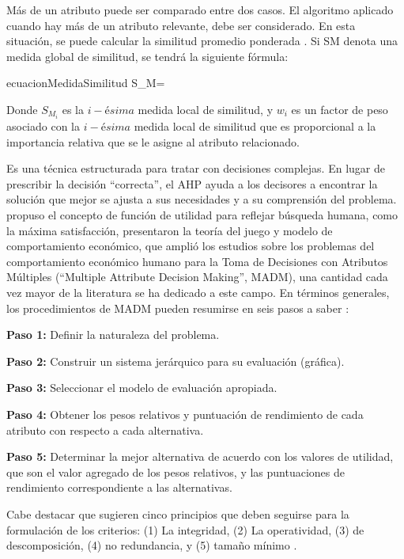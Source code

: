 Más de un atributo puede ser comparado entre dos casos. El algoritmo aplicado cuando hay más de un atributo relevante, debe ser considerado. En esta situación, se puede calcular la similitud promedio ponderada \cite[]{pal2004foundations}. Si SM denota una medida global de similitud, se tendrá la siguiente fórmula:
\begin{ecuacion}{ecuacionMedidaSimilitud}
	{S}_{M}=
\end{ecuacion}
Donde $S_{M_{i}}$ es la $i-ésima$ medida local de similitud, y $w_{i}$ es un factor de peso asociado con la $i-ésima$ medida local de similitud que es proporcional a la importancia relativa que se le asigne al atributo relacionado.

Es una técnica estructurada para tratar con decisiones complejas. En lugar de prescribir la decisión “correcta”, el AHP ayuda a los decisores a encontrar la solución que mejor se ajusta a sus necesidades y a su comprensión del problema. \citet{bernoulli1783sammlung} propuso el concepto de función de utilidad para reflejar búsqueda humana, como la máxima satisfacción, \citet{neumann1947theory}  presentaron la teoría del juego y modelo de comportamiento económico, que amplió los estudios sobre los  problemas del  comportamiento económico humano para la Toma de Decisiones con Atributos Múltiples (“Multiple Attribute Decision Making”, MADM), una cantidad cada vez mayor de la literatura se ha dedicado a este campo. En términos generales, los procedimientos de MADM pueden resumirse en seis pasos a saber \cite[]{dubois1980systems}:
\begin{viñetas}
\item \textbf{Paso 1:} Definir la naturaleza del problema.
\item \textbf{Paso 2:} Construir un sistema jerárquico para su evaluación (gráfica). 
\item \textbf{Paso 3:} Seleccionar el modelo de evaluación apropiada.
\item \textbf{Paso 4:} Obtener los pesos relativos y puntuación de rendimiento de cada atributo con respecto a cada alternativa.
\item \textbf{Paso 5:} Determinar la mejor alternativa de acuerdo con los valores de utilidad, que son el valor agregado de los pesos relativos, y las puntuaciones de rendimiento correspondiente a las alternativas.
\\
\end{viñetas}
Cabe destacar que \citet{keeney1976decision} sugieren cinco principios que deben seguirse para la formulación de los criterios: 
(1) La integridad, (2) La operatividad, (3) de descomposición, (4) no redundancia, y (5) tamaño mínimo .
